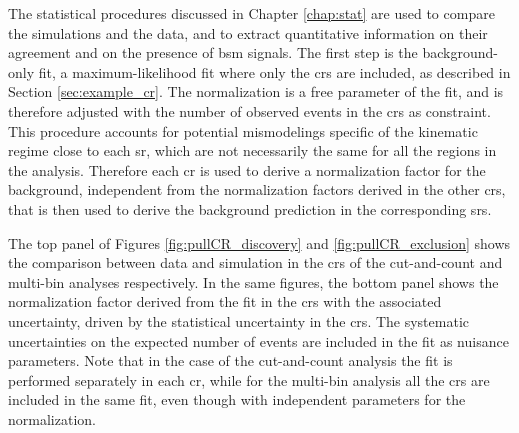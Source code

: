 The statistical procedures discussed in Chapter \ref{chap:stat} are used to compare the simulations and the data, and to extract 
quantitative information on their agreement and on the presence of \gls{bsm} signals. 
The first step is the background-only fit, a maximum-likelihood fit where only the \glspl{cr} are included, as described in Section 
\ref{sec:example_cr}. 
The \ttbar normalization is a free parameter of the fit, and is therefore adjusted with the number of observed events in the \glspl{cr} 
as constraint.
This procedure accounts for potential mismodelings specific of the kinematic regime close to each \gls{sr}, which are not necessarily 
the same for all the regions in the analysis. Therefore each \gls{cr} is used to derive a normalization factor for the \ttbar background,
independent from the normalization factors derived in the other \glspl{cr}, that is then used to derive the background prediction in the 
corresponding \glspl{sr}. 

The top panel of Figures \ref{fig:pullCR_discovery} and \ref{fig:pullCR_exclusion} shows the 
comparison between data and simulation in the 
\glspl{cr} of the cut-and-count and multi-bin analyses respectively. In the same figures, the bottom panel 
shows the \ttbar normalization factor derived from the fit in the \glspl{cr} with the associated uncertainty, driven by the statistical uncertainty 
in the \glspl{cr}.  The systematic uncertainties on the expected number of events are included in the fit as nuisance parameters.
Note that in the case of the cut-and-count analysis the fit is performed separately in each \gls{cr}, 
while for the multi-bin analysis all the \glspl{cr} are included in the same fit, even though with independent parameters for the 
\ttbar normalization. 
 

